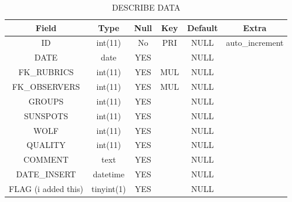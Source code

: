 \documentclass[12pt]{article}
\begin{document}
\begin{table}[h!]
    \centering
    \caption{DESCRIBE DATA}
    \begin{tabular}{c|c|c|c|c|c}%
        \textbf{Field} & \textbf{Type} & \textbf{Null} & \textbf{Key} & \textbf{Default} & \textbf{Extra}  \\
        \hline
        ID & int(11) & No & PRI & NULL & auto\_increment \\
        
        DATE & date & YES && NULL & \\
        
        FK\_RUBRICS & int(11) & YES & MUL & NULL &  \\
        
        FK\_OBSERVERS & int(11) & YES & MUL & NULL &  \\
        
        GROUPS & int(11) & YES && NULL &  \\
        
        SUNSPOTS & int(11) & YES && NULL & \\
        
        WOLF & int(11) & YES && NULL &  \\
        
        QUALITY & int(11) & YES && NULL &  \\
        
        COMMENT & text & YES && NULL &  \\
        
        DATE\_INSERT & datetime & YES && NULL &  \\
        
        FLAG (i added this) & tinyint(1) & YES && NULL &  \\
        
    \end{tabular}
    \label{tab:data-og}
\end{table}
\end{document}
